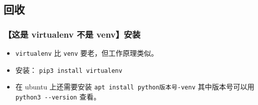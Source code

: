 \subsection{回收}

\subsubsection{【这是 virtualenv 不是 venv】安装}
\begin{itemize}
\item \verb`virtualenv` 比 \verb`venv` 要老，但工作原理类似。
\item 安装： \verb`pip3 install virtualenv`
\item 在 ubuntu 上还需要安装 \verb`apt install python版本号-venv` 其中版本号可以用 \verb`python3 --version` 查看。
\end{itemize}

